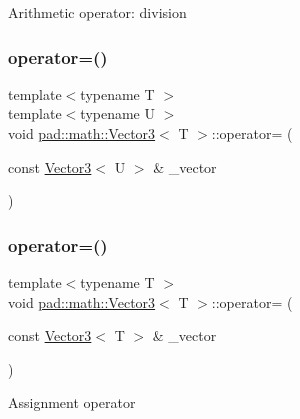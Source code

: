 Arithmetic operator\+: division \mbox{\label{structpad_1_1math_1_1_vector3_a33986a35c9534de7caec3353e19f0b10}} 
\subsubsection{\texorpdfstring{operator=()}{operator=()}\hspace{0.1cm}{\footnotesize\ttfamily [1/3]}}
{\footnotesize\ttfamily template$<$typename T $>$ \\
template$<$typename U $>$ \\
void \mbox{\hyperlink{structpad_1_1math_1_1_vector3}{pad\+::math\+::\+Vector3}}$<$ T $>$\+::operator= (\begin{DoxyParamCaption}\item[{const \mbox{\hyperlink{structpad_1_1math_1_1_vector3}{Vector3}}$<$ U $>$ \&}]{\+\_\+vector }\end{DoxyParamCaption})}

\mbox{\label{structpad_1_1math_1_1_vector3_aabaa38eda86b1ebc0ad7b10ce3dd146e}} 
\subsubsection{\texorpdfstring{operator=()}{operator=()}\hspace{0.1cm}{\footnotesize\ttfamily [2/3]}}
{\footnotesize\ttfamily template$<$typename T $>$ \\
void \mbox{\hyperlink{structpad_1_1math_1_1_vector3}{pad\+::math\+::\+Vector3}}$<$ T $>$\+::operator= (\begin{DoxyParamCaption}\item[{const \mbox{\hyperlink{structpad_1_1math_1_1_vector3}{Vector3}}$<$ T $>$ \&}]{\+\_\+vector }\end{DoxyParamCaption})}

Assignment operator \mbox{\label{structpad_1_1math_1_1_vector3_af89a8db6bdfd4ce06a96e63021e9ed9a}} 
